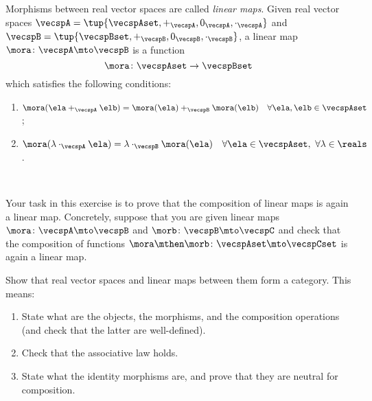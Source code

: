 
\begin{gradedexercise}
\label{ex:linear-maps}

Morphisms between real vector spaces are called \emph{linear maps}. Given real vector spaces $\vecspA = \tup{\vecspAset, +_{\vecspA}, 0_{\vecspA}, \cdot_{\vecspA}}$ and $\vecspB = \tup{\vecspBset, +_{\vecspB}, 0_{\vecspB}, \cdot_{\vecspB}}$, a linear map $\mora \colon \vecspA \mto \vecspB$ is a function
\begin{equation}
\mora \colon \vecspAset \to \vecspBset
\end{equation}
which satisfies the following conditions: 
\begin{enumerate}
\item $\mora(\ela +_{\vecspA} \elb) = \mora(\ela) +_{\vecspB} \mora(\elb) \quad \forall \ela, \elb \in \vecspAset$;
\item $\mora(\lambda \cdot_{\vecspA} \ela) = \lambda \cdot_{\vecspB}  \mora(\ela) \quad \forall \ela \in \vecspAset, \ \forall \lambda \in \reals$.
\end{enumerate}

\


Your task in this exercise is to prove that the composition of linear maps is again a linear map. Concretely, suppose that you are given linear maps $\mora \colon \vecspA \mto \vecspB$ and $\morb \colon \vecspB \mto \vecspC$ and check that the composition of functions $\mora \mthen \morb \colon \vecspAset \mto \vecspCset$ is again a linear map. 
        
\end{gradedexercise}



\begin{gradedexercise}
        \label{ex:category-real-vect}

Show that real vector spaces and linear maps between them form a category. This means:
\begin{enumerate}
\item State what are the objects, the morphisms, and the composition operations (and check that the latter are well-defined).
\item Check that the associative law holds.
\item State what the identity morphisms are, and prove that they are neutral for composition.
\end{enumerate}
        
\end{gradedexercise}

